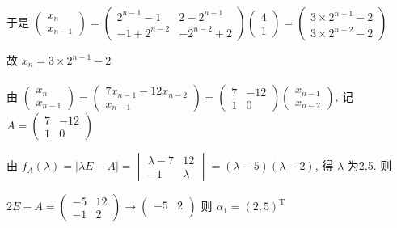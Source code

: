 		 于是 \( \begin{pmatrix}
			 x_{n} \\
			 x_{n-1}
		 \end{pmatrix} = \begin{pmatrix}
			 2^{n-1}-1  & 2-2^{n-1}  \\
			 -1+2^{n-2} & -2^{n-2}+2
		 \end{pmatrix}\begin{pmatrix}
			 4 \\
			 1
		 \end{pmatrix} = \begin{pmatrix}
			 3\times2^{n-1}-2 \\
			 3\times2^{n-2}-2
		 \end{pmatrix} \)

		 故 \( x_{n} = 3\times2^{n-1}-2 \)


	 \paragraph{} %
		 由 \( \begin{pmatrix}
			 x_{n} \\
			 x_{n-1}
		 \end{pmatrix} = \begin{pmatrix}
			 7x_{n-1} - 12x_{n-2} \\
			 x_{n-1}
		 \end{pmatrix} = \begin{pmatrix}
			 7 & -12 \\
			 1 & 0
		 \end{pmatrix}\begin{pmatrix}
			 x_{n-1} \\
			 x_{n-2}
		 \end{pmatrix} \), 记 \( A = \begin{pmatrix}
			 7 & -12 \\
			 1 & 0
		 \end{pmatrix} \)

		 由 \( f_{A}(\lambda) = |\lambda E - A| = \begin{vmatrix}
			 \lambda-7 & 12      \\
			 -1        & \lambda
		 \end{vmatrix} = (\lambda-5)(\lambda-2) \), 得 \( \lambda \) 为2,5. 则

		 \( 2E-A = \begin{pmatrix}
			 -5 & 12 \\
			 -1 & 2
		 \end{pmatrix} \rightarrow \begin{pmatrix}
			 -5 & 2 \\
			    &
		 \end{pmatrix} \) 则 \( \alpha_{1} = (2,5)^{\mathrm{T}} \)

